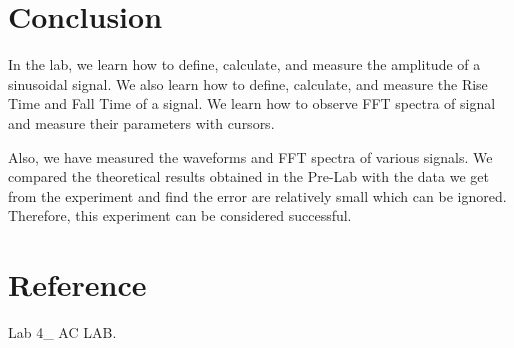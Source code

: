 \documentclass{article}
\begin{document}
\section{Conclusion}

In the lab, we learn how to define, calculate, and measure the amplitude of a sinusoidal signal. We also learn how to define, calculate, and measure the Rise Time and Fall Time of a signal. We learn how to observe FFT spectra of signal and measure their parameters with cursors.

Also, we have measured the waveforms and FFT spectra of various signals. We compared the theoretical results obtained in the Pre-Lab with the data we get from the experiment and find the error are relatively small which can be ignored. Therefore, this experiment can be considered successful.



\section{Reference}

Lab 4\_ AC LAB.
\end{document}
